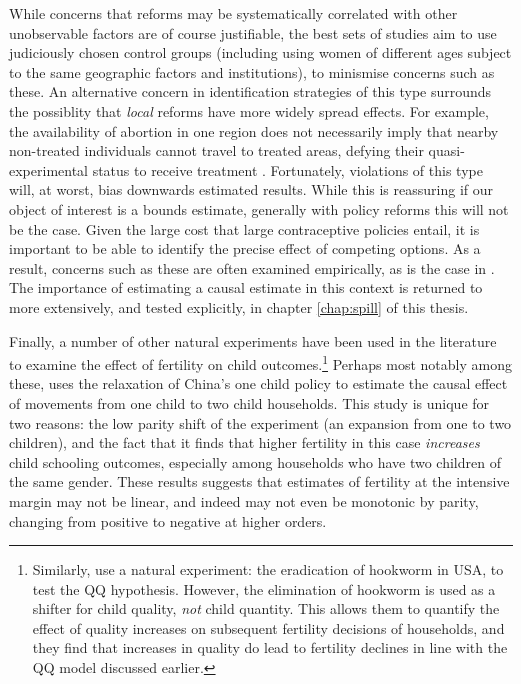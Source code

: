 While concerns that reforms may be systematically correlated with other 
unobservable factors are of course justifiable, the best sets of studies aim to 
use judiciously chosen control groups (including using women of different ages 
subject to the same geographic factors and institutions), to minismise concerns 
such as these. An alternative concern in identification strategies of this type 
surrounds the possiblity that \emph{local} reforms have more widely spread
effects.  For example, the availability of abortion in one region does not
necessarily imply that nearby non-treated individuals cannot travel to
treated areas, defying their quasi-experimental status to receive treatment 
\citep{Levineetal1999}. Fortunately, violations of this type will, at worst, 
bias downwards estimated results. While this is reassuring if our object of
interest is a bounds estimate, generally with policy reforms this will not be
the case.  Given the large cost that large contraceptive policies entail, it
is important to be able to identify the precise effect of competing options. 
As a result, concerns such as these are often examined empirically, as is the 
case in \citet{Christensen2012}. The importance of estimating a causal estimate
in this context is returned to more extensively, and tested explicitly, in 
chapter \ref{chap:spill} of this thesis.

Finally, a number of other natural experiments have been used in the 
literature to examine the effect of fertility on child outcomes.\footnote{
Similarly, \citet{BleakleyLange2009} use a natural experiment: the eradication
of hookworm in USA, to test the QQ hypothesis.  However, the elimination of
hookworm is used as a shifter for child quality, \emph{not} child quantity.
This allows them to quantify the effect of quality increases on subsequent
fertility decisions of households, and they find that increases in quality
do lead to fertility declines in line with the QQ model discussed earlier.}
Perhaps most notably among these, \citet{Qian2009} uses the relaxation of 
China's one child policy to estimate the causal effect of movements from one 
child to two child households.  This study is unique for two reasons: the low 
parity shift of the experiment (an expansion from one to two children), and the 
fact that it finds that higher fertility in this case \emph{increases} child 
schooling outcomes, especially among households who have two children of the 
same gender. These results suggests that estimates of fertility at the intensive 
margin may not be linear, and indeed may not even be monotonic by parity, 
changing from positive to negative at higher orders.

